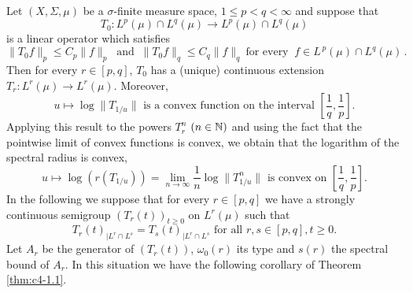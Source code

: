 Let $(X,\Sigma,\mu)$ be a $\sigma$-finite measure space, $1 \leq p < q < \infty$ and suppose that 
\[
T_{0} \colon L^{p}(\mu) \cap L^{q}(\mu) \to L^{p}(\mu) \cap L^{q}(\mu)
\]
is a linear operator which satisfies 
\[
\|T_{0}f\|_{p} \leq C_{p}\|f\|_{p} \ \text{ and } \ \|T_{0}f\|_{q} \leq C_{q}\|f\|_{q} 
\ \text{for every } \ f\in L^{\,p}(\mu) \cap L^{q}(\mu)\,.
\]
Then for every $r \in [p,q]$, $T_{0}$ has a (unique) continuous extension $T_{r} \colon L^{r}(\mu) \to L^{r}(\mu)$.
Moreover,
\begin{equation}\label{eq:c4-1.1}
u \mapsto \log\|T_{1/u}\| \text{ is a convex function on the interval } \left[\frac{1}{q},\frac{1}{p}\right].
\end{equation}
Applying this result to the powers $T_{r}^{n}$ $(n \in\mathbb{N})$ and using the fact that the pointwise limit of convex functions is convex, we obtain that the logarithm of the spectral radius is convex, \ie
\begin{equation}\label{eq:c4-1.2}
u \mapsto \log(r(T_{1/u})) = \lim_{n\to\infty} \frac{1}{n}\log\|T_{1/u}^{n}\| \text{ is convex on }  \left[\frac{1}{q},\frac{1}{p}\right].
\end{equation}
In the following we suppose that for every $r \in [p,q]$ we have a strongly continuous semigroup $(T_{r}(t))_{t\geq 0}$ on $L^{r}(\mu)$ such that
\begin{equation}\label{eq:c4-1.3}
T_{r}(t)_{|L^{r} \cap L^{s}} = T_{s}(t)_{|L^{r} \cap L^{s}} \text{ for all } r,s \in [p,q], t \geq 0.
\end{equation}
Let $A_{r}$ be the generator of $(T_{r}(t))$, $\omega_{0}(r)$ its type and $s(r)$ the spectral bound of $A_{r}$.
In this situation we have the following corollary of Theorem \ref{thm:c4-1.1}.


